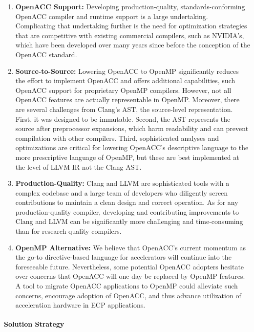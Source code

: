 \begin{enumerate}

\item \textbf{OpenACC Support:} Developing production-quality,
standards-conforming OpenACC compiler and runtime support is a large
undertaking.  Complicating that undertaking further is the need for
optimization strategies that are competitive with existing commercial
compilers, such as NVIDIA's, which have been developed over many years
since before the conception of the OpenACC standard.

\item \textbf{Source-to-Source:} Lowering OpenACC to OpenMP
significantly reduces the effort to implement OpenACC and offers
additional capabilities, such OpenACC support for proprietary OpenMP
compilers.  However, not all OpenACC features are actually
representable in OpenMP.  Moreover, there are several challenges from
Clang's AST, the source-level representation.  First, it was designed
to be immutable.  Second, the AST represents the source after
preprocessor expansions, which harm readability and can prevent
compilation with other compilers.  Third, sophisticated analyses and
optimizations are critical for lowering OpenACC's descriptive language
to the more prescriptive language of OpenMP, but these are best
implemented at the level of LLVM IR not the Clang AST.

\item \textbf{Production-Quality:} Clang and LLVM are sophisticated tools
with a complex codebase and a large team of developers who diligently screen
contributions to maintain a clean design and correct operation.  As for any
production-quality compiler, developing and contributing improvements to
Clang and LLVM can be significantly more challenging and time-consuming than
for research-quality compilers.

\item \textbf{OpenMP Alternative:} We believe that OpenACC's current
momentum as the go-to directive-based language for accelerators will
continue into the foreseeable future.  Nevertheless, some potential OpenACC
adopters hesitate over concerns that OpenACC will one day be replaced by
OpenMP features.  A tool to migrate OpenACC applications to OpenMP could
alleviate such concerns, encourage adoption of OpenACC, and thus advance
utilization of acceleration hardware in ECP applications.

\end{enumerate}

\paragraph{Solution Strategy}

